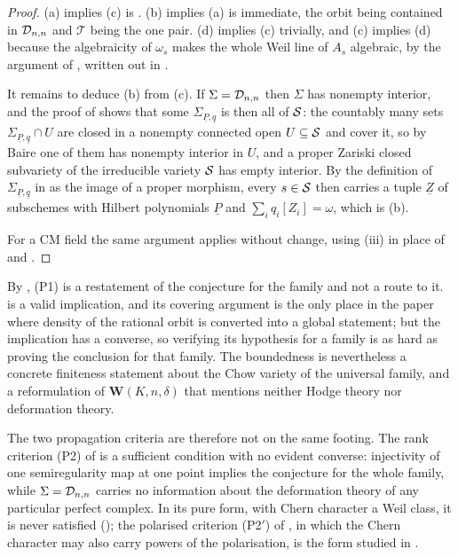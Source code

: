 \begin{proof}
(a) implies (c) is . (b) implies (a) is immediate, the
orbit being contained in $\mathcal{D}_{n,n}$ and $\mathcal{T}$ being the one pair.
(d) implies (c) trivially, and (c) implies (d) because the algebraicity of
$\omega_{s}$ makes the whole Weil line of $A_{s}$ algebraic, by the argument
of , written out in .

It remains to deduce (b) from (c). If $\Sigma=\mathcal{D}_{n,n}$ then $\Sigma$ has
nonempty interior, and the proof of  shows that some
$\Sigma_{\underline{P},\underline{q}}$ is then all of $\mathcal{S}$: the countably
many sets $\Sigma_{\underline{P},\underline{q}}\cap U$ are closed in a
nonempty connected open $U\subseteq\mathcal{S}$ and cover it, so by Baire one of them
has nonempty interior in $U$, and a proper Zariski closed subvariety of the
irreducible variety $\mathcal{S}$ has empty interior. By the definition of
$\Sigma_{\underline{P},\underline{q}}$ in  as the image of a proper morphism, every $s\in\mathcal{S}$
then carries a tuple $\underline{Z}$ of subschemes with Hilbert polynomials
$\underline{P}$ and $\sum_{i}q_{i}[Z_{i}]=\omega$, which is (b).

For a CM field the same argument applies without change, using
(iii) in place of  and
.
\end{proof}

\begin{remark}\label{rem:p1collapse}
By , \textup{(P1)} is a restatement of the conjecture
for the family and not a route to it.  is a valid
implication, and its covering argument is the only place in the paper where
density of the rational orbit is converted into a global statement; but the
implication has a converse, so verifying its hypothesis for a family is as
hard as proving the conclusion for that family. The boundedness is
nevertheless a concrete finiteness statement about the Chow variety of the
universal family, and a reformulation of $\mathbf{W}(K,n,\delta)$ that
mentions neither Hodge theory nor deformation theory.

The two propagation criteria are therefore not on the same footing. The rank
criterion \textup{(P2)} of  is a sufficient
condition with no evident converse: injectivity of one semiregularity map at
one point implies the conjecture for the whole family, while
$\Sigma=\mathcal{D}_{n,n}$ carries no information about the deformation theory of any
particular perfect complex. In its pure form, with Chern character a Weil
class, it is never satisfied (); the polarised criterion
\textup{(P2$'$)} of , in which the Chern character may also
carry powers of the polarisation, is the form studied in
.
\end{remark}


